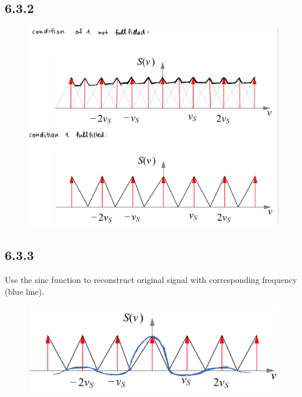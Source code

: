 \documentclass[a4paper]{article}
\begin{document}
\newpage
\subsection*{6.3.2}
\begin{figure}[!ht]
	\centering
	\includegraphics[width=0.88\linewidth]{6_2.png}
	\label{fig:condition}
\end{figure}

\subsection*{6.3.3}
Use the sinc function to reconstruct original signal with corresponding frequency (blue line). 
\begin{figure}[!h]
	\centering
	\includegraphics[width=0.88\linewidth]{6_3.png}
	\label{fig:filter}
\end{figure}
\end{document}
